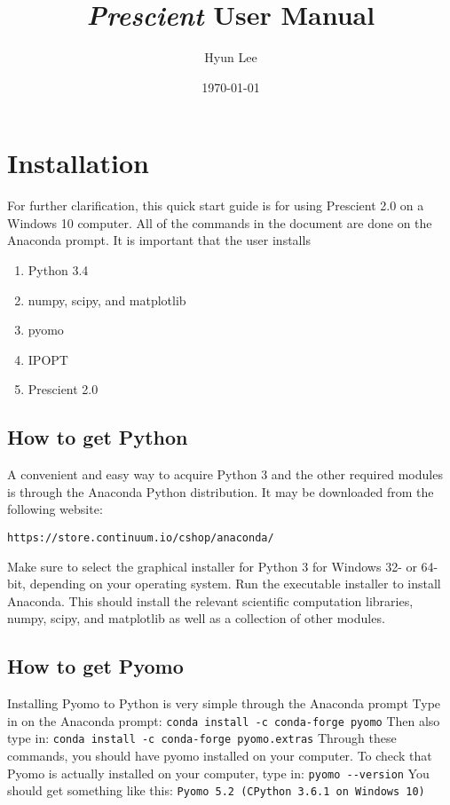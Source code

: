 \documentclass[12pt]{article}
\begin{document}
\title{\textsl{Prescient} User Manual}
\date{\today}
\author{Hyun Lee}

\maketitle
\section{Installation}
For further clarification, this quick start guide is for using Prescient 2.0 on a Windows 10 computer. All of the commands in the document are done on the Anaconda prompt.\newline
It is important that the user installs \begin{enumerate}
	\item Python 3.4
	\item numpy, scipy, and matplotlib
	\item pyomo
	\item IPOPT
	\item Prescient 2.0
	
\end{enumerate}

\subsection{How to get Python}
A convenient and easy way to acquire Python 3 and the other required modules is through the Anaconda Python distribution. It may be downloaded from the following website:
\begin{verbatim}
https://store.continuum.io/cshop/anaconda/
\end{verbatim}
Make sure to select the graphical installer for Python 3 for Windows 32- or 64-bit, depending on your operating system. Run the executable installer to install Anaconda.
This should install the relevant scientific computation libraries, numpy, scipy, and matplotlib as well as a collection of other modules.\newline
\subsection{How to get Pyomo}
Installing Pyomo to Python is very simple through the Anaconda prompt\newline
Type in on the Anaconda prompt:\newline
\verb|conda install -c conda-forge pyomo|\newline
Then also type in:\newline
\verb|conda install -c conda-forge pyomo.extras|\newline
Through these commands, you should have pyomo installed on your computer. To check that Pyomo is actually installed on your computer, type in:\newline
\verb|pyomo --version|\newline
You should get something like this:\newline
\verb|Pyomo 5.2 (CPython 3.6.1 on Windows 10)|
\end{document}

